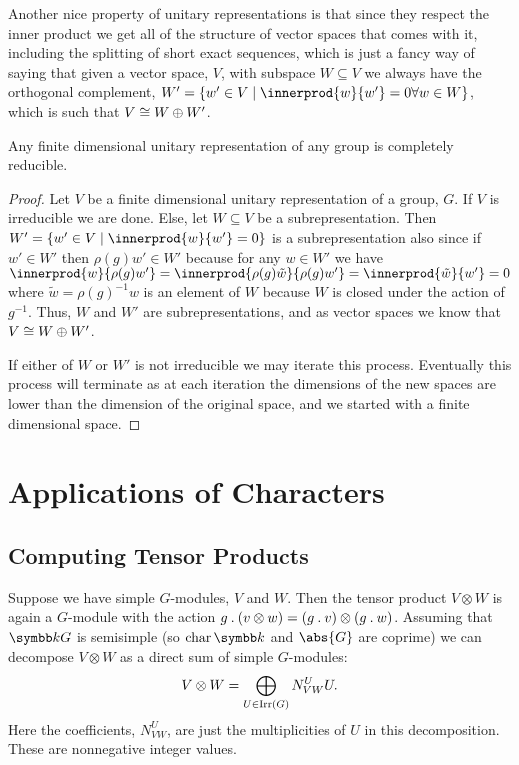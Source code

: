 Another nice property of unitary representations is that since they respect the inner product we get all of the structure of vector spaces that comes with it, including the splitting of short exact sequences, which is just a fancy way of saying that given a vector space, \(V\), with subspace \(W \subseteq V\) we always have the orthogonal complement, \(W' = \{w' \in V \mid \innerprod{w}{w'} = 0 \forall w \in W\}\), which is such that \(V \cong W \oplus W'\).

\begin{thm}{}{}
    Any finite dimensional unitary representation of any group is completely reducible.
    \begin{proof}
        Let \(V\) be a finite dimensional unitary representation of a group, \(G\).
        If \(V\) is irreducible we are done.
        Else, let \(W \subseteq V\) be a subrepresentation.
        Then \(W' = \{w' \in V \mid \innerprod{w}{w'} = 0\}\) is a subrepresentation also since if \(w' \in W'\) then \(\rho(g)w' \in W'\) because for any \(w \in W'\) we have \(\innerprod{w}{\rho(g)w'} = \innerprod{\rho(g)\tilde{w}}{\rho(g)w'} = \innerprod{\tilde{w}}{w'} = 0\) where \(\tilde{w} = \rho(g)^{-1}w\) is an element of \(W\) because \(W\) is closed under the action of \(g^{-1}\).
        Thus, \(W\) and \(W'\) are subrepresentations, and as vector spaces we know that \(V \cong W \oplus W'\).
        
        If either of \(W\) or \(W'\) is not irreducible we may iterate this process.
        Eventually this process will terminate as at each iteration the dimensions of the new spaces are lower than the dimension of the original space, and we started with a finite dimensional space.
    \end{proof}
\end{thm}

\chapter{Applications of Characters}
\section{Computing Tensor Products}
Suppose we have simple \(G\)-modules, \(V\) and \(W\).
Then the tensor product \(V \otimes W\) is again a \(G\)-module with the action \(g \mathbin{.} (v \otimes w) = (g \mathbin{.} v) \otimes (g \mathbin{.} w)\).
Assuming that \(\field G\) is semisimple (so \(\Char \field\) and \(\abs{G}\) are coprime) we can decompose \(V \otimes W\) as a direct sum of simple \(G\)-modules:
\begin{equation}
    V \otimes W = \bigoplus_{U \in \operatorname{Irr}(G)} N^U_{VW} U.
\end{equation}
Here the coefficients, \(N^U_{VW}\), are just the multiplicities of \(U\) in this decomposition.
These are nonnegative integer values.

